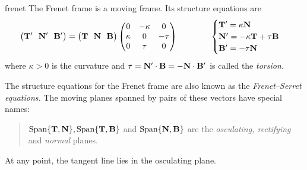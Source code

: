 \begin{thm}{}{frenet}
	The Frenet frame is a moving frame. Its structure equations are
	\[
		\bigl(\vT'\ \ \vN'\ \ \vB'\bigr)
  	=
  	\bigl(\vT\ \ \vN\ \ \vB\bigr)
  	\begin{pmatrix}
			0&-\kappa&0\\
			\kappa&0&-\tau\\
			0&\tau&0
		\end{pmatrix}
		\qquad\qquad 
		\begin{cases}
			\vT'=\kappa\vN\\
			\vN'=-\kappa\vT+\tau\vB\\
			\vB'=-\tau\vN
		\end{cases}
  \]
	where $\kappa>0$ is the curvature and $\tau={\mathbf{N}}'\cdot{\mathbf{B}}=-{\mathbf{N}}\cdot{\mathbf{B}}'$ is called the \emph{torsion.}
\end{thm}


The structure equations for the Frenet frame are also known as the \emph{Frenet--Serret equations.} The moving planes spanned by pairs of these vectors have special names:
\begin{quote}
	$\operatorname{Span}\{{\mathbf{T}},{\mathbf{N}}\},\operatorname{Span}\{{\mathbf{T}},{\mathbf{B}}\}$ and $\operatorname{Span}\{{\mathbf{N}},{\mathbf{B}}\}$ are the \emph{osculating, rectifying} and \emph{normal} planes.
\end{quote}
At any point, the tangent line lies in the osculating plane. %


\goodbreak
	
